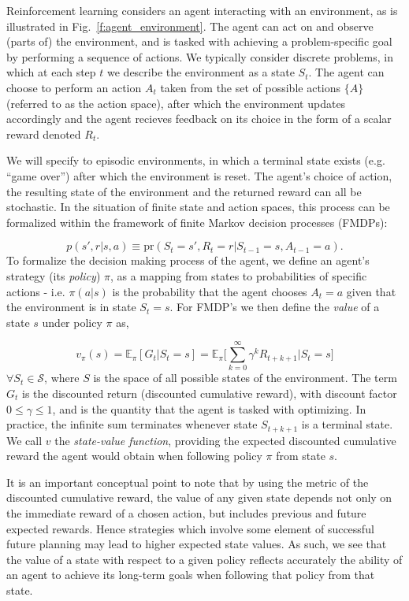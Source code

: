 \documentclass[twocolumn,preprintnumbers,amsmath,amssymb,notitlepage,nofootinbib,longbibliography,superscriptaddress,aps,pra,10pt]{revtex4-1}
\begin{document}
	Reinforcement learning considers an agent interacting with an environment, as is illustrated in Fig.~\ref{f:agent_environment}.
	The agent can act on and observe (parts of) the environment, and is tasked with achieving a problem-specific goal by performing a sequence of actions.
	We typically consider discrete problems, in which at each step $t$ we describe the environment as a state $S_t$. The agent can choose to perform an action $A_t$ taken from
	the set of possible actions $\{A\}$ (referred to as the action space), after which the environment updates accordingly and the agent recieves feedback on its choice in the form of a scalar reward denoted $R_t$.

	We will specify to episodic environments, in which a terminal state exists (e.g. ``game over'') after which the environment is reset.
	The agent's choice of action, the resulting state of the environment and the returned reward can all be stochastic. In the situation of finite state
	and action spaces, this process can be formalized within the framework of finite Markov decision processes (FMDPs):

	\begin{equation}
		p(s',r|s,a) \equiv \mathrm{pr}(S_t = s',R_t = r|S_{t-1} = s, A_{t-1} = a).
	\end{equation}
	To formalize the decision making process of the agent, we define an agent's strategy (its \textit{policy}) $\pi$, as a mapping from states to probabilities
	of specific actions - i.e. $\pi(a|s)$ is the probability that the agent chooses $A_t = a$ given that the environment is in state $S_t = s$.
	For FMDP's we then define the \textit{value} of a state $s$ under policy $\pi$ as,

	\begin{equation}
		v_{\pi}(s) = \mathbb{E}_{\pi}[G_t|S_t = s]  = \mathbb{E}_{\pi} \Big[\sum_{k = 0}^{\infty}\gamma^k R_{t+k+1}\Big| S_t = s \Big]
	\end{equation}
	$\forall S_t \in \mathcal{S}$, where $S$ is the space of all possible states of the environment. The term $G_t$ is the discounted return (discounted cumulative reward),
	with discount factor $0 \leq \gamma \leq 1$, and is the quantity that the agent is tasked with optimizing. In practice, the infinite sum terminates whenever state $S_{t+k+1}$ is a terminal state.
	We call $v$ the \textit{state-value function}, providing the expected discounted cumulative reward the agent would obtain when following policy $\pi$ from state $s$.

	It is an important conceptual point to note that by using the metric of the discounted cumulative reward, the value of any given state depends not only on the
	immediate reward of a chosen action, but includes previous and future expected rewards. Hence strategies which involve some element of successful future planning
	may lead to higher expected state values.
	As such, we see that the value of a state with respect to a given policy reflects accurately the ability of an agent to achieve its long-term goals when
	following that policy from that state.
\end{document}
